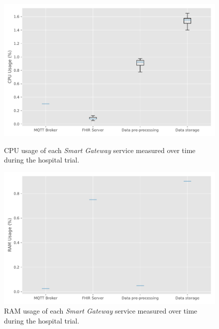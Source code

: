 \begin{figure}[H]
    \begin{minipage}{0.45\linewidth}
        \centering
        \includegraphics[width=\linewidth]{images/pilot_cpu_usage.pdf}
        \caption{\acs{CPU} usage of each \textit{Smart Gateway} service measured over time during the hospital trial.}
        \label{fig:pilot-cpu-usage}
    \end{minipage}
    \hspace{0.05\linewidth}
    \begin{minipage}{0.45\linewidth}
        \centering
        \includegraphics[width=\linewidth]{images/pilot_ram_usage.pdf}
        \caption{\acs{RAM} usage of each \textit{Smart Gateway} service measured over time during the hospital trial.}
        \label{fig:pilot-ram-usage}
    \end{minipage}
\end{figure}



